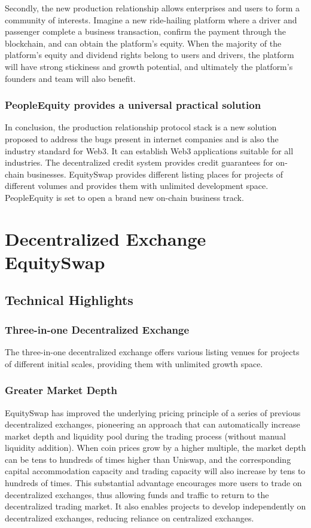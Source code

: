 \documentclass{article}
\begin{document}
Secondly, the new production relationship allows enterprises and users to form a community of interests. Imagine a new ride-hailing platform where a driver and passenger complete a business transaction, confirm the payment through the blockchain, and can obtain the platform's equity. When the majority of the platform's equity and dividend rights belong to users and drivers, the platform will have strong stickiness and growth potential, and ultimately the platform's founders and team will also benefit.

\subsubsection{PeopleEquity provides a universal practical solution}

In conclusion, the production relationship protocol stack is a new solution proposed to address the bugs present in internet companies and is also the industry standard for Web3. It can establish Web3 applications suitable for all industries. The decentralized credit system provides credit guarantees for on-chain businesses. EquitySwap provides different listing places for projects of different volumes and provides them with unlimited development space. PeopleEquity is set to open a brand new on-chain business track.


\section{Decentralized Exchange EquitySwap}

\subsection{Technical Highlights}
\subsubsection{Three-in-one Decentralized Exchange}

The three-in-one decentralized exchange offers various listing venues for projects of different initial scales, providing them with unlimited growth space.

\subsubsection{Greater Market Depth}

EquitySwap has improved the underlying pricing principle of a series of previous decentralized exchanges, pioneering an approach that can automatically increase market depth and liquidity pool during the trading process (without manual liquidity addition). When coin prices grow by a higher multiple, the market depth can be tens to hundreds of times higher than Uniswap, and the corresponding capital accommodation capacity and trading capacity will also increase by tens to hundreds of times. This substantial advantage encourages more users to trade on decentralized exchanges, thus allowing funds and traffic to return to the decentralized trading market. It also enables projects to develop independently on decentralized exchanges, reducing reliance on centralized exchanges.
\end{document}
